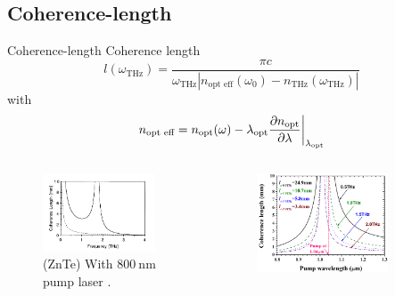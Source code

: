 \documentclass[aspectratio=1610, 9pt]{beamer}
\begin{document}
\subsection{Coherence-length}
\begin{frame}{Coherence-length}
Coherence length \cite{coherence_legnth}
\begin{equation}
    l(\omega_{\text{THz}}) = \frac{\pi c}{\omega_{\text{THz}} \left | n_\text{opt eff}(\omega_0) - n_{\text{THz}}(\omega_{\text{THz}})\right |}
\end{equation}
with 
\begin{equation}
    n_{\text{opt eff}} = n_\text{opt}(\omega) - \lambda_\text{opt}\frac{\partial n_\text{opt}}{\partial \lambda}\biggl{|}_{\lambda_\text{opt}}  
\end{equation}
\begin{center}
  \begin{columns}
    \begin{column}{.4\textwidth}
    \begin{figure}
      \includegraphics[width=0.9\textwidth]{images/coherence_length_ZnTe.png}
      \caption{(ZnTe) With $\SI{800}{\nano\meter}$ pump laser \cite{coherence_legnth}.}
    \end{figure}%
    \end{column}
    \begin{column}{.4\textwidth}
    \begin{figure}
      \includegraphics[width=0.8\textwidth]{images/GAP_coherencelength.png}

\end{figure}
\end{column}
\end{columns}
\end{center}
\end{frame}
\end{document}
